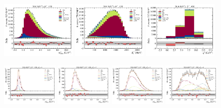 \begin{figure}[htb]
    \centering
    \includegraphics[width=0.32\textwidth]{./figs-fit-fit-results/ctrl-fit/stacked/fit_result-stacked-Dst-1os-mmiss2.pdf}
    \includegraphics[width=0.32\textwidth]{./figs-fit-fit-results/ctrl-fit/stacked/fit_result-stacked-Dst-1os-el.pdf}
    \includegraphics[width=0.32\textwidth]{./figs-fit-fit-results/ctrl-fit/stacked/fit_result-stacked-Dst-1os-q2.pdf}

    \includegraphics[width=0.24\textwidth]{./figs-fit-fit-results/ctrl-fit/lines_q2_slices/fit_result-lines_q2_idx1-Dst-1os-mmiss2.pdf}
    \includegraphics[width=0.24\textwidth]{./figs-fit-fit-results/ctrl-fit/lines_q2_slices/fit_result-lines_q2_idx2-Dst-1os-mmiss2.pdf}
    \includegraphics[width=0.24\textwidth]{./figs-fit-fit-results/ctrl-fit/lines_q2_slices/fit_result-lines_q2_idx3-Dst-1os-mmiss2.pdf}
    \includegraphics[width=0.24\textwidth]{./figs-fit-fit-results/ctrl-fit/lines_q2_slices/fit_result-lines_q2_idx4-Dst-1os-mmiss2.pdf}


\end{figure}
